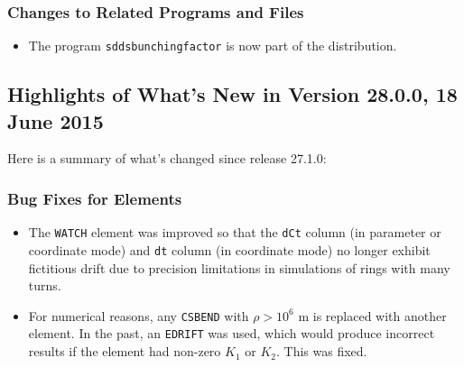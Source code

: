 \documentclass[11pt]{article}
\begin{document}
\subsubsection{Changes to Related Programs and Files}

\begin{itemize}
\item The program \verb|sddsbunchingfactor| is now part of the distribution.
\end{itemize}

\subsection{Highlights of What's New in Version 28.0.0, 18 June 2015}

Here is a summary of what's changed since release 27.1.0:

\subsubsection{Bug Fixes for Elements}

\begin{itemize}
\item The \verb|WATCH| element was improved so that the \verb|dCt| column (in parameter or coordinate mode) and \verb|dt| column (in coordinate mode)
  no longer exhibit fictitious drift due to precision limitations in simulations of rings with many turns.
\item For numerical reasons, any \verb|CSBEND| with $\rho>10^6$ m is replaced with another element. In the past, an \verb|EDRIFT| was used,
  which would produce incorrect results if the element had non-zero $K_1$ or $K_2$. This was fixed. 
\end{itemize}
\end{document}
